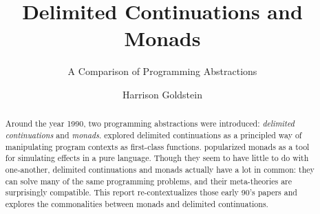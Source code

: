 \documentclass[acmsmall, nonacm, screen]{acmart}
\begin{document}
\title{Delimited Continuations and Monads}
\subtitle{A Comparison of Programming Abstractions}

\author{Harrison Goldstein}

\renewcommand{\shortauthors}{Goldstein}

\begin{abstract}
  Around the year 1990, two programming abstractions were introduced: {\em delimited
  continuations} and {\em monads}. \citet{danvy1989functional} explored delimited continuations
  as a principled way of manipulating program contexts as first-class functions.
  \citet{wadler1990comprehending} popularized monads as a tool for simulating effects in a pure
  language. Though they seem to have little to do with one-another, delimited continuations and
  monads actually have a lot in common: they can solve many of the same programming problems, and
  their meta-theories are surprisingly compatible. This report re-contextualizes those early 90's
  papers and explores the commonalities between monads and delimited continuations.
\end{abstract}

\maketitle
\end{document}

